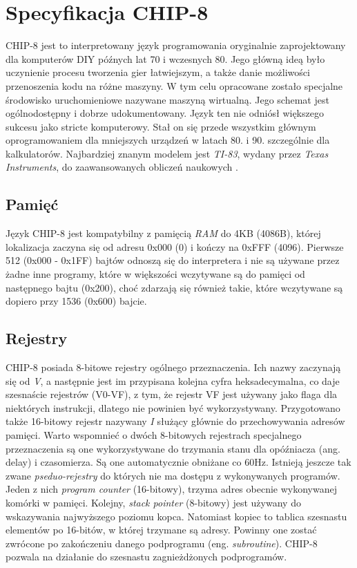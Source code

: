 \section{Specyfikacja CHIP-8}
 CHIP-8 jest to interpretowany język programowania oryginalnie zaprojektowany dla komputerów DIY późnych lat 70 i wczesnych 80. Jego główną ideą było uczynienie procesu tworzenia gier łatwiejszym, a także danie możliwości przenoszenia kodu na różne maszyny. W tym celu opracowane zostało specjalne środowisko uruchomieniowe nazywane maszyną wirtualną. Jego schemat jest ogólnodostępny i dobrze udokumentowany. Język ten nie odniósł większego sukcesu jako stricte komputerowy. Stał on się przede wszystkim głównym oprogramowaniem dla mniejszych urządzeń w latach 80. i 90. szczególnie dla kalkulatorów. Najbardziej znanym modelem jest \textit{TI-83}, wydany przez \textit{Texas Instruments}, do zaawansowanych obliczeń naukowych \cite{Cowgod}.

\subsection{Pamięć}
 Język CHIP-8 jest kompatybilny z pamięcią \textit{RAM} do 4KB (4086B), której lokalizacja zaczyna się od adresu 0x000 (0) i kończy na 0xFFF (4096). Pierwsze 512 (0x000 - 0x1FF) bajtów odnoszą się do interpretera i nie są używane przez żadne inne programy, które w większości wczytywane są do pamięci od następnego bajtu (0x200), choć zdarzają się również takie, które wczytywane są dopiero przy 1536 (0x600) bajcie.

\subsection{Rejestry}
  CHIP-8 posiada 8-bitowe rejestry ogólnego przeznaczenia. Ich nazwy zaczynają się od \textit{V}, a następnie jest im przypisana kolejna cyfra heksadecymalna, co daje szesnaście rejestrów (V0-VF), z tym, że rejestr VF jest używany jako flaga dla niektórych instrukcji, dlatego nie powinien być wykorzystywany. Przygotowano także 16-bitowy rejestr nazywany \textit{I} służący głównie do przechowywania adresów pamięci. Warto wspomnieć o dwóch 8-bitowych rejestrach specjalnego przeznaczenia są one wykorzystywane do trzymania stanu dla opóźniacza (ang. delay) i czasomierza. Są one automatycznie obniżane co 60Hz. Istnieją jeszcze tak zwane \textit{pseduo-rejestry} do których nie ma dostępu z wykonywanych programów. Jeden z nich \textit{program counter} (16-bitowy), trzyma adres obecnie wykonywanej komórki w pamięci. Kolejny, \textit{stack pointer} (8-bitowy) jest używany do wskazywania najwyższego poziomu kopca. Natomiast kopiec to tablica szesnastu elementów po 16-bitów, w której trzymane są adresy. Powinny one zostać zwrócone po zakończeniu danego podprogramu (eng. \textit{subroutine}). CHIP-8 pozwala na działanie do szesnastu zagnieżdżonych podprogramów. 

